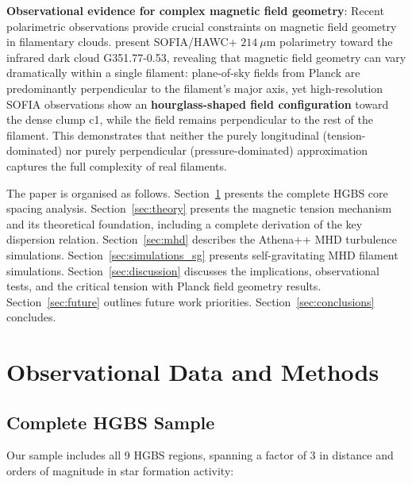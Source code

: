 \documentclass[11pt,a4paper]{article}
\begin{document}
\textbf{Observational evidence for complex magnetic field geometry}: Recent polarimetric observations provide crucial constraints on magnetic field geometry in filamentary clouds. \citet{Jadhav2026} present SOFIA/HAWC+ $214~\mu$m polarimetry toward the infrared dark cloud G351.77-0.53, revealing that magnetic field geometry can vary dramatically within a single filament: plane-of-sky fields from Planck are predominantly perpendicular to the filament's major axis, yet high-resolution SOFIA observations show an \textbf{hourglass-shaped field configuration} toward the dense clump c1, while the field remains perpendicular to the rest of the filament. This demonstrates that neither the purely longitudinal (tension-dominated) nor purely perpendicular (pressure-dominated) approximation captures the full complexity of real filaments.

The paper is organised as follows. Section~\ref{sec:observations} presents the complete HGBS core spacing analysis. Section~\ref{sec:theory} presents the magnetic tension mechanism and its theoretical foundation, including a complete derivation of the key dispersion relation. Section~\ref{sec:mhd} describes the Athena++ MHD turbulence simulations. Section~\ref{sec:simulations_sg} presents self-gravitating MHD filament simulations. Section~\ref{sec:discussion} discusses the implications, observational tests, and the critical tension with Planck field geometry results. Section~\ref{sec:future} outlines future work priorities. Section~\ref{sec:conclusions} concludes.

\section{Observational Data and Methods}
\label{sec:observations}

\subsection{Complete HGBS Sample}

Our sample includes all 9 HGBS regions, spanning a factor of 3 in distance and orders of magnitude in star formation activity:
\end{document}
